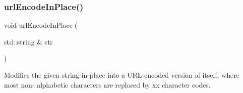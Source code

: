 \subsubsection{\texorpdfstring{url\+Encode\+In\+Place()}{urlEncodeInPlace()}}
{\footnotesize\ttfamily void url\+Encode\+In\+Place (\begin{DoxyParamCaption}\item[{std\+::string \&}]{str }\end{DoxyParamCaption})}



Modifies the given string in-\/place into a U\+R\+L-\/encoded version of itself, where most non-\/ alphabetic characters are replaced by xx character codes. 

